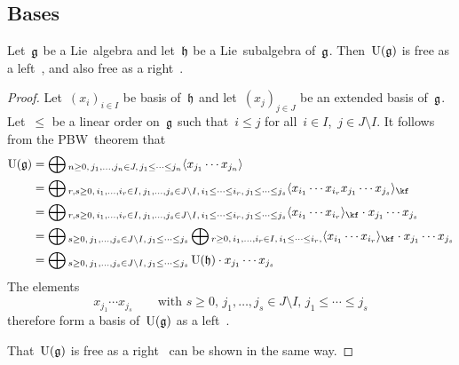 \subsection*{Bases}

\begin{proposition}
  Let~$\mathfrak{g}$ be a Lie~algebra and let~$\hlie$ be a Lie~subalgebra of~$\mathfrak{g}$.
  Then~$\operatorname{U}(\mathfrak{g})$ is free as a left~\module{$\Univ(\hlie)$}, and also free as a right~\module{$\Univ(\hlie)$}.
\end{proposition}


\begin{proof}
  Let~$(x_i)_{i \in I}$ be basis of~$\hlie$ and let~$(x_j)_{j \in J}$ be an extended basis of~$\mathfrak{g}$.
  Let~$\leq$ be a linear order on~$\mathfrak{g}$ such that~$i \leq j$ for all~$i \in I$,~$j \in J \setminus I$.
  It follows from the PBW~theorem that
  \begin{align*}
    \Univ(\glie)
    &=
    \bigoplus{}_{
      n \geq 0 ,\,
      j_1, \dotsc, j_n \in J,\,
      j_1 \leq \dotsb \leq j_n
    }
    \gen{ x_{j_1} \dotsm x_{j_n} }
    \\
    &=
    \bigoplus{}_{
      r, s \geq 0,\,
      i_1, \dotsc, i_r \in I,\,
      j_1, \dotsc, j_s \in J \setminus I,\,
      i_1 \leq \dotsb \leq i_r,\,
      j_1 \leq \dotsb \leq j_s
    }
    \gen{ x_{i_1} \dotsm x_{i_r} x_{j_1} \dotsm x_{j_s} }_{\kf}
    \\
    &=
    \bigoplus{}_{
      r, s \geq 0,\,
      i_1, \dotsc, i_r \in I,\,
      j_1, \dotsc, j_s \in J \setminus I,\,
      i_1 \leq \dotsb \leq i_r,\,
      j_1 \leq \dotsb \leq j_s
    }
    \gen{ x_{i_1} \dotsm x_{i_r} }_{\kf}
    \cdot x_{j_1} \dotsm x_{j_s}
    \\
    &=
    \bigoplus{}_{
      s \geq 0,\,
      j_1, \dotsc, j_s \in J \setminus I,\,
      j_1 \leq \dotsb \leq j_s
    }
    \bigoplus{}_{
      r \geq 0,\,
      i_1, \dotsc, i_r \in I,\,
      i_1 \leq \dotsb \leq i_r,
    }
    \gen{ x_{i_1} \dotsm x_{i_r} }_{\kf}
    \cdot x_{j_1} \dotsm x_{j_s}
    \\
    &=
    \bigoplus{}_{
      s \geq 0,\,
      j_1, \dotsc, j_s \in J \setminus I,\,
      j_1 \leq \dotsb \leq j_s
    }
    \Univ(\hlie)
    \cdot x_{j_1} \dotsm x_{j_s}
  \end{align*}
  The elements
  \[
    x_{j_1} \dotsm x_{j_s}
    \qquad
    \text{with~$s \geq 0$,~$j_1, \dotsc, j_s \in J \setminus I$,~$j_1 \leq \dotsb \leq j_s$}
  \]
  therefore form a basis of~$\operatorname{U}(\mathfrak{g})$ as a left~\module{$\Univ(\hlie)$}.
  
  That~$\operatorname{U}(\mathfrak{g})$ is free as a right~\module{$\hlie$} can be shown in the same way.
\end{proof}


